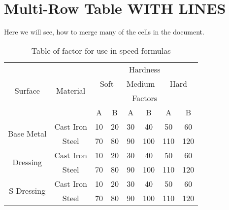 \documentclass{article}
\begin{document}
	
	
		\section{Multi-Row Table WITH LINES}
	Here we will see, how to merge many of the cells in the document.
	
	
	\begin{table}[h]
		\centering
		\begin{tabular}{|c|c|c|c|c|c|c|c|}   \hline
			
			\multirow{4}{*}{Surface}       & \multirow{4}{*}{Material} & \multicolumn{6}{c|}{Hardness}   \\   \cline{3-8}
			&                                 & \multicolumn{2}{c|}{Soft} & \multicolumn{2}{c|}{Medium} & \multicolumn{2}{c|}{Hard}  \\  \cline{3-8}
			&                                 & \multicolumn{6}{c|}{Factors}                                                                        \\      \cline{3-8}
			&                                 &      A      &   B         &     A       &    B        &     A      &   B    \\     \hline
			\multirow{2}{*}{Base Metal}  &		  Cast Iron           &      10     &   20       &   30       &    40      &    50     &     60  \\  \cline{2-8} 
			&           Steel              &      70     &   80       &   90       &   100     &   110      &   120    \\     \hline
			\multirow{2}{*}{Dressing}      & 		 Cast Iron          &       10     &     20     &    30      &     40    &    50      &  60     \\   \cline{2-8}
			&            Steel             &       70    &     80     &      90    &    100     &     110   &   120    \\    \hline
			\multirow{2}{*}{S Dressing}  & 		 Cast Iron          &       10     &       20   &    30      &    40      &     50    &   60    \\	 \cline{2-8}
			&            Steel             &      70      &     80     &     90     &      100  &   110     &   120    \\            \hline
			
		\end{tabular}
		\caption{Table of factor for use in speed formulas}	
	\end{table}	
	
\end{document}
